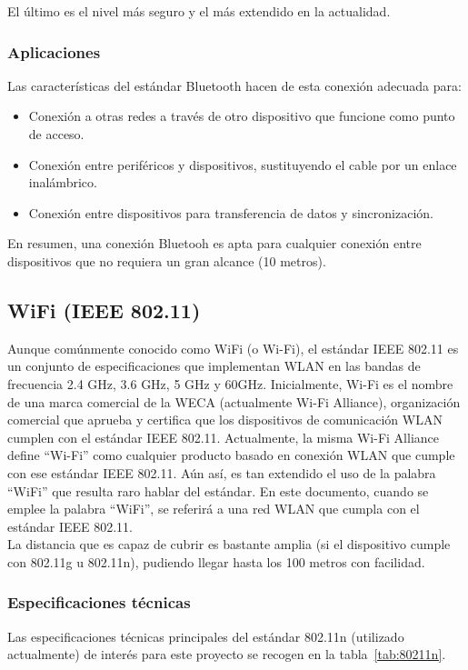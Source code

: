         El último es el nivel más seguro y el más extendido en la actualidad.

        \subsubsection{Aplicaciones}
        Las características del estándar Bluetooth hacen de esta conexión adecuada para:

        \begin{itemize}
            \item Conexión a otras redes a través de otro dispositivo que funcione como punto de acceso.
            \item Conexión entre periféricos y dispositivos, sustituyendo el cable por un enlace inalámbrico.
            \item Conexión entre dispositivos para transferencia de datos y sincronización.
        \end{itemize}

        En resumen, una conexión Bluetooh es apta para cualquier conexión entre dispositivos que no requiera un gran alcance (10 metros).

    \subsection{WiFi (IEEE 802.11)}
        Aunque comúnmente conocido como WiFi (o Wi-Fi), el estándar IEEE 802.11 es un conjunto de especificaciones que implementan WLAN en las bandas de frecuencia 2.4 GHz, 3.6 GHz, 5 GHz y 60GHz. Inicialmente, Wi-Fi es el nombre de una marca comercial de la WECA (actualmente Wi-Fi Alliance), organización comercial que aprueba y certifica que los dispositivos de comunicación WLAN cumplen con el estándar IEEE 802.11. Actualmente, la misma Wi-Fi Alliance define ``Wi-Fi'' como cualquier producto basado en conexión WLAN que cumple con ese estándar IEEE 802.11. Aún así, es tan extendido el uso de la palabra ``WiFi'' que resulta raro hablar del estándar. En este documento, cuando se emplee la palabra ``WiFi'', se referirá a una red WLAN que cumpla con el estándar IEEE 802.11.\\

        La distancia que es capaz de cubrir es bastante amplia (si el dispositivo cumple con 802.11g u 802.11n), pudiendo llegar hasta los 100 metros con facilidad.

        \subsubsection{Especificaciones técnicas}
        Las especificaciones técnicas principales del estándar 802.11n (utilizado actualmente) de interés para este proyecto se recogen en la tabla~\ref{tab:80211n}.

